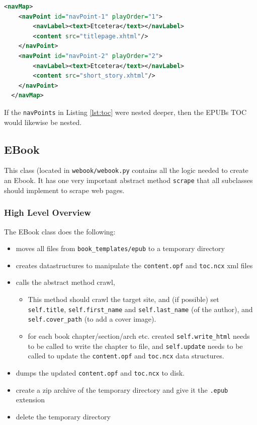 \documentclass[]{report}   %
\begin{document}
\begin{minipage}{\linewidth}
\begin{lstlisting}[language=XML, label={lst:toc}, 
                   caption={toc.ncx example <navMap>}]
<navMap>
    <navPoint id="navPoint-1" playOrder="1">
        <navLabel><text>Etcetera</text></navLabel>
        <content src="titlepage.xhtml"/>
    </navPoint>
    <navPoint id="navPoint-2" playOrder="2">
        <navLabel><text>Etcetera</text></navLabel>
        <content src="short_story.xhtml"/>
    </navPoint>
  </navMap>
\end{lstlisting}
\end{minipage}

If the \texttt{navPoints} in Listing \ref{lst:toc} were nested deeper, then the
EPUBs TOC would likewise be nested.

\subsection{EBook}
\label{sec:ebook}
This class (located in \texttt{webook/webook.py} contains all the logic needed
to create an Ebook. It has one very important abstract method \texttt{scrape}
that all subclasses should implement to scrape web pages.

\subsubsection{High Level Overview}
The EBook class does the following:

\begin{itemize}
	\item moves all files from \texttt{book\_templates/epub} to a temporary directory
	\item creates datastructures to manipulate the \texttt{content.opf} and \texttt{toc.ncx} xml files
	\item calls the abstract method crawl, 
	\begin{itemize}
		\item  This method should crawl the target site, and (if possible) set
			\texttt{self.title}, \texttt{self.first\_name} and \texttt{self.last\_name} (of the author), and
			\texttt{self.cover\_path} (to add a cover image).
		\item for each book chapter/section/arch etc. created
			\texttt{self.write\_html} needs to be called to write the chapter
			to file, and \texttt{self.update} needs to be called to update the
			\texttt{content.opf} and \texttt{toc.ncx} data structures.
	\end{itemize}
		\item dumps the updated \texttt{content.opf} and \texttt{toc.ncx} to disk. 
		\item create a zip archive of the temporary directory and give it the \texttt{.epub} extension
		\item delete the temporary directory
\end{itemize}
\end{document}
